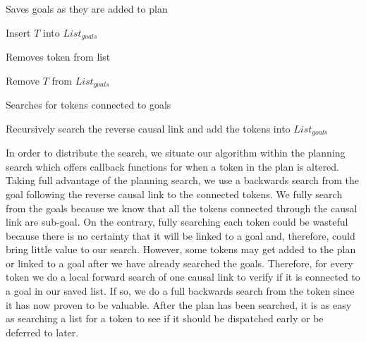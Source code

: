\begin{algorithm}
\caption{Saves goals as they are added to plan}
\label{NotifyAdded}
\begin{algorithmic}
	\State Insert $T$ into $List_{goals}$
\EndIf 
\EndFunction
\end{algorithmic}
\end{algorithm}

\begin{algorithm}
\caption{Removes token from list}
\label{NotifyRemoved}
\begin{algorithmic}
	\State Remove $T$ from $List_{goals}$
\EndFunction
\end{algorithmic}
\end{algorithm}

\begin{algorithm}
\caption{Searches for tokens connected to goals}
\label{NotifyActivated}
\begin{algorithmic}
	\State Recursively search the reverse causal link and add the tokens into $List_{goals}$
\EndIf
\EndFunction
\end{algorithmic}
\end{algorithm}

In order to distribute the search, we situate our algorithm within the planning search which
offers callback functions for when a token in the plan is altered. Taking full advantage of the planning 
search, we use a backwards search from the goal following the reverse causal link to the connected tokens. 
We fully search from the goals because we know that all the tokens connected through the causal link are 
sub-goal.  On the contrary, fully searching each token could be wasteful because there is no certainty that 
it will be linked to a goal and, therefore, could bring little value to our search. However, some tokens 
may get added to the plan or linked to a goal after we have already searched the goals. Therefore, for every 
token we do a local forward search of one causal link to verify if it is connected to a goal in our saved list. 
If so, we do a full backwards search from the token since it has now proven to be valuable. After the plan has 
been searched, it is as easy as searching a list for a token to see if it should be dispatched early or be deferred
to later.  




